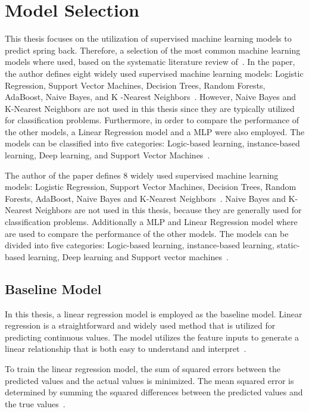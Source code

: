 \section{Model Selection}\label{sec:model-selection}
This thesis focuses on the utilization of supervised machine learning models to predict
spring back.
Therefore, a selection of the most common machine learning models where used, based on
the systematic literature review of~\cite{
    dridi2021supervised}.
In the paper, the author defines eight widely used supervised machine learning models: Logistic
Regression, Support Vector Machines, Decision Trees, Random Forests, AdaBoost, Naive Bayes, and K
-Nearest Neighbors~\cite[p. 8]{dridi2021supervised}.
However, Naive Bayes and K-Nearest Neighbors are not used in this thesis since they are typically
utilized for classification problems.
Furthermore, in order to compare the performance of the other models, a Linear Regression model
and a \ac{MLP} were also employed. The models can be classified into five categories: Logic-based
learning, instance-based learning, Deep learning, and Support Vector
Machines~\cite[p. 8]{dridi2021supervised}.

The author of the paper defines 8 widely used supervised machine learning models:
Logistic Regression, Support Vector Machines, Decision Trees, Random Forests, AdaBoost, Naive
Bayes and K-Nearest Neighbors~\cite[p. 8]{dridi2021supervised}.
Naive Bayes and K-Nearest Neighbors are not used in this thesis, because they are
generally used for classification problems.
Additionally a \ac{MLP} and Linear Regression model where are used to compare the performance of
the other models.
The models can be divided into five categories:
Logic-based learning, instance-based learning, static-based learning, Deep learning and
Support vector machines~\cite[p. 8]{dridi2021supervised}.

\subsection{Baseline Model}\label{subsec:regression-models}
In this thesis, a linear regression model is employed as the baseline model.
Linear regression is a straightforward and widely used method that is utilized for predicting
continuous values.
The model utilizes the feature inputs to generate a linear relationship that is both easy to
understand and interpret~\cite[p. 37]{molnar2020interpretable}.

To train the linear regression model, the sum of squared errors between the predicted values and
the actual values is minimized.
The mean squared error is determined by summing the squared differences between the predicted
values and the true values~\cite[p. 47--68]{muller_introductionmachinelearning_2016}.

